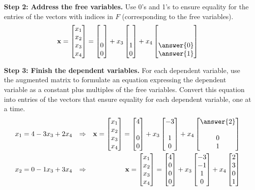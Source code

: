 \documentclass{ximera}
\begin{document}
\begin{example}
  \textbf{Step 2: Address the free variables.}  Use 0's and 1's to ensure equality for the entries
  of the vectors with indices in $F$ (corresponding to the free
  variables).
  \[
    \vect{x}=\colvector{x_1\\x_2\\x_3\\x_4}=
    \colvector{\ \\\ \\0\\0}+x_3\colvector{\ \\\ \\1\\0}+x_4\colvector{\ \\\ \\\answer{0}\\\answer{1}}
  \]

  \textbf{Step 3: Finish the dependent variables.}  For each dependent
  variable, use the augmented matrix to formulate an equation
  expressing the dependent variable as a constant plus multiples of
  the free variables.  Convert this equation into entries of the
  vectors that ensure equality for each dependent variable, one at a
  time.
  \begin{align*}
    x_1=4-3x_3+2x_4&&\Rightarrow&&
                                   \vect{x}=\colvector{x_1\\x_2\\x_3\\x_4}=
    \colvector{4\\\ \\0\\0}+x_3\colvector{-3\\\ \\1\\0}+x_4\colvector{\answer{2}\\\ \\0\\1}\\
    x_2=0-1x_3+3x_4&&\Rightarrow&&
                                   \vect{x}=\colvector{x_1\\x_2\\x_3\\x_4}=
    \colvector{4\\0\\0\\0}+x_3\colvector{-3\\-1\\1\\0}+x_4\colvector{2\\3\\0\\1}
  \end{align*}


\end{example}
\end{document}
